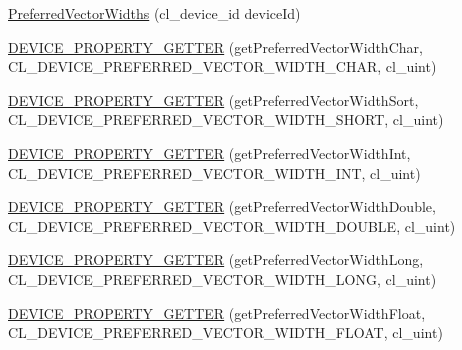 \begin{DoxyCompactItemize}
\item 
\hyperlink{class_c_l_ray_tracer_1_1_open_c_l_utils_1_1_c_l_device_1_1_preferred_vector_widths_abb7ee59a82cf40f583d770544793297e}{Preferred\+Vector\+Widths} (cl\+\_\+device\+\_\+id device\+Id)
\item 
\hyperlink{class_c_l_ray_tracer_1_1_open_c_l_utils_1_1_c_l_device_1_1_preferred_vector_widths_a76785c1853c2efce91cb876dc64a480e}{D\+E\+V\+I\+C\+E\+\_\+\+P\+R\+O\+P\+E\+R\+T\+Y\+\_\+\+G\+E\+T\+T\+ER} (get\+Preferred\+Vector\+Width\+Char, C\+L\+\_\+\+D\+E\+V\+I\+C\+E\+\_\+\+P\+R\+E\+F\+E\+R\+R\+E\+D\+\_\+\+V\+E\+C\+T\+O\+R\+\_\+\+W\+I\+D\+T\+H\+\_\+\+C\+H\+AR, cl\+\_\+uint)
\item 
\hyperlink{class_c_l_ray_tracer_1_1_open_c_l_utils_1_1_c_l_device_1_1_preferred_vector_widths_ae76d693378c533cabe99b6eaa5d1f1bd}{D\+E\+V\+I\+C\+E\+\_\+\+P\+R\+O\+P\+E\+R\+T\+Y\+\_\+\+G\+E\+T\+T\+ER} (get\+Preferred\+Vector\+Width\+Sort, C\+L\+\_\+\+D\+E\+V\+I\+C\+E\+\_\+\+P\+R\+E\+F\+E\+R\+R\+E\+D\+\_\+\+V\+E\+C\+T\+O\+R\+\_\+\+W\+I\+D\+T\+H\+\_\+\+S\+H\+O\+RT, cl\+\_\+uint)
\item 
\hyperlink{class_c_l_ray_tracer_1_1_open_c_l_utils_1_1_c_l_device_1_1_preferred_vector_widths_a3ebfcdbb49378b4ed9a7c1efd62705e9}{D\+E\+V\+I\+C\+E\+\_\+\+P\+R\+O\+P\+E\+R\+T\+Y\+\_\+\+G\+E\+T\+T\+ER} (get\+Preferred\+Vector\+Width\+Int, C\+L\+\_\+\+D\+E\+V\+I\+C\+E\+\_\+\+P\+R\+E\+F\+E\+R\+R\+E\+D\+\_\+\+V\+E\+C\+T\+O\+R\+\_\+\+W\+I\+D\+T\+H\+\_\+\+I\+NT, cl\+\_\+uint)
\item 
\hyperlink{class_c_l_ray_tracer_1_1_open_c_l_utils_1_1_c_l_device_1_1_preferred_vector_widths_a47e8526908835296a9b4319a1709437a}{D\+E\+V\+I\+C\+E\+\_\+\+P\+R\+O\+P\+E\+R\+T\+Y\+\_\+\+G\+E\+T\+T\+ER} (get\+Preferred\+Vector\+Width\+Double, C\+L\+\_\+\+D\+E\+V\+I\+C\+E\+\_\+\+P\+R\+E\+F\+E\+R\+R\+E\+D\+\_\+\+V\+E\+C\+T\+O\+R\+\_\+\+W\+I\+D\+T\+H\+\_\+\+D\+O\+U\+B\+LE, cl\+\_\+uint)
\item 
\hyperlink{class_c_l_ray_tracer_1_1_open_c_l_utils_1_1_c_l_device_1_1_preferred_vector_widths_ad279f752224ed31399d82cdd57d7189a}{D\+E\+V\+I\+C\+E\+\_\+\+P\+R\+O\+P\+E\+R\+T\+Y\+\_\+\+G\+E\+T\+T\+ER} (get\+Preferred\+Vector\+Width\+Long, C\+L\+\_\+\+D\+E\+V\+I\+C\+E\+\_\+\+P\+R\+E\+F\+E\+R\+R\+E\+D\+\_\+\+V\+E\+C\+T\+O\+R\+\_\+\+W\+I\+D\+T\+H\+\_\+\+L\+O\+NG, cl\+\_\+uint)
\item 
\hyperlink{class_c_l_ray_tracer_1_1_open_c_l_utils_1_1_c_l_device_1_1_preferred_vector_widths_a9663d1b5221f88ce7534d35294dffcce}{D\+E\+V\+I\+C\+E\+\_\+\+P\+R\+O\+P\+E\+R\+T\+Y\+\_\+\+G\+E\+T\+T\+ER} (get\+Preferred\+Vector\+Width\+Float, C\+L\+\_\+\+D\+E\+V\+I\+C\+E\+\_\+\+P\+R\+E\+F\+E\+R\+R\+E\+D\+\_\+\+V\+E\+C\+T\+O\+R\+\_\+\+W\+I\+D\+T\+H\+\_\+\+F\+L\+O\+AT, cl\+\_\+uint)
\end{DoxyCompactItemize}


